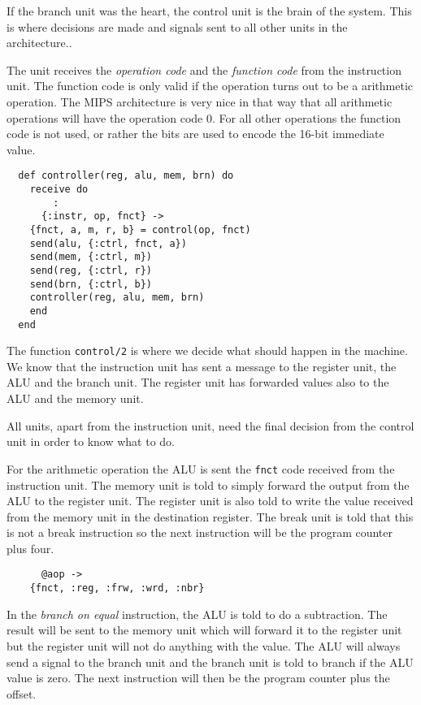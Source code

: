 \documentclass[a4paper,11pt]{article}
\begin{document}
If the branch unit was the heart, the control unit is the brain of the
system. This is where decisions are made and signals sent to all
other units in the architecture..

The unit receives the {\em operation code} and the {\em function code}
from the instruction unit. The function code is only valid if the
operation turns out to be a arithmetic operation. The MIPS
architecture is very nice in that way that all arithmetic operations
will have the operation code $0$. For all other operations the
function code is not used, or rather the bits are used to encode the
16-bit immediate value.


\begin{verbatim}
  def controller(reg, alu, mem, brn) do
    receive do
        :
      {:instr, op, fnct} ->
	{fnct, a, m, r, b} = control(op, fnct)
	send(alu, {:ctrl, fnct, a})
	send(mem, {:ctrl, m})
	send(reg, {:ctrl, r})
	send(brn, {:ctrl, b})
	controller(reg, alu, mem, brn)
    end
  end
\end{verbatim}

The function {\tt control/2} is where we decide what should happen
in the machine. We know that the instruction unit has sent a message
to the register unit, the ALU and the branch unit. The register unit has forwarded
values also to the ALU and the memory unit. 

All units, apart from the instruction unit, need the final decision
from the control unit in order to know what to do.

For the arithmetic operation the ALU is sent the {\tt fnct} code
received from the instruction unit. The memory unit is told to simply
forward the output from the ALU to the register unit. The register
unit is also told to write the value received from the memory unit in
the destination register. The break unit is told that this is not a
break instruction so the next instruction will be the program counter
plus four.

\begin{verbatim}
      @aop ->
	{fnct, :reg, :frw, :wrd, :nbr}
\end{verbatim}

In the {\em branch on equal} instruction, the ALU is told to do a
subtraction. The result will be sent to the memory unit which will
forward it to the register unit but the register unit will not do
anything with the value. The ALU will always send a signal to the
branch unit and the branch unit is told to branch if the ALU value is
zero. The next instruction will then be the program counter plus the
offset.
\end{document}
